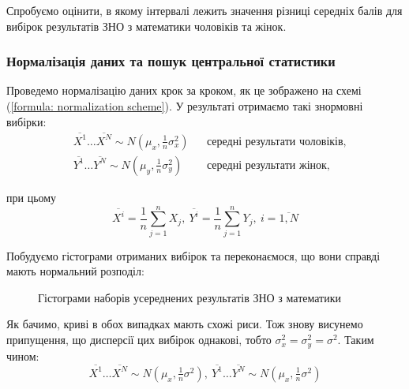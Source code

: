 Спробуємо оцінити, в якому інтервалі лежить значення різниці середніх балів для вибірок результатів ЗНО з 
математики чоловіків та жінок.

\subsubsection*{Нормалізація даних та пошук центральної статистики}

Проведемо нормалізацію даних крок за кроком, як це зображено на схемі (\ref{formula: normalization scheme}). 
У результаті отримаємо такі знормовні вибірки:
\begin{align*}
    &\overline{X^1}\ldots \overline{X^N}\sim N(\mu_x,\tfrac{1}{n}\sigma_x^2) && \text{середні результати чоловіків,} \\
    &\overline{Y^1}\ldots \overline{Y^N}\sim N(\mu_y,\tfrac{1}{n}\sigma_y^2) && \text{середні результати жінок,}
\end{align*}

при цьому
\[ \overline{X^i}=\frac{1}{n}\sum\limits_{j=1}^nX_j,\ \overline{Y^i}=\frac{1}{n}\sum\limits_{j=1}^nY_j,\ i=\overline{1,N} \]

Побудуємо гістограми отриманих вибірок та переконаємося, що вони справді мають нормальний розподіл:

\begin{figure}[H]
    \caption{Гістограми наборів усереднених результатів ЗНО з математики}
    \label{fig:MATH means data}
\end{figure}

Як бачимо, криві в обох випадках мають схожі риси. Тож знову висунемо припущення, що дисперсії цих вибірок 
однакові, тобто $\sigma_x^2=\sigma_y^2=\sigma^2$. Таким чином: 
\begin{equation*}
    \overline{X^1}\ldots \overline{X^N}\sim N(\mu_x,\tfrac{1}{n}\sigma^2),\ 
    \overline{Y^1}\ldots \overline{Y^N}\sim N(\mu_x,\tfrac{1}{n}\sigma^2)
\end{equation*}

